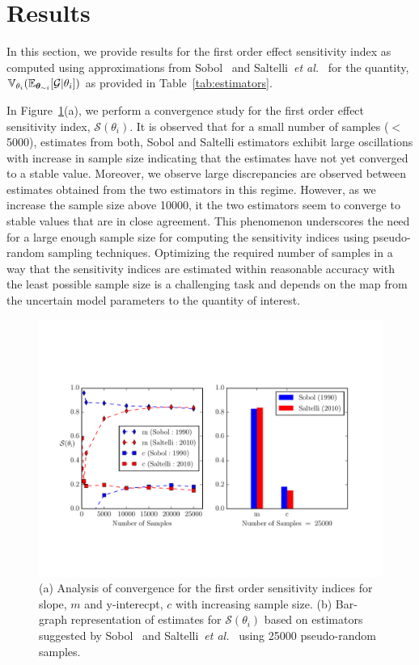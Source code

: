 \section{Results}

In this section, we provide results for the first order effect sensitivity index as computed using approximations
from Sobol~\cite{Sobol:1990} and Saltelli~\emph{et al.}~\cite{Saltelli:2010} for the quantity,
$\operatorname{\mathbb{V}}_{\theta_{i}}(\operatorname{\mathbb{E}}_{\bm \theta_{\sim i}}[\mathcal{G}\vert\theta_{i}])$ as provided in Table~\ref{tab:estimators}.
 
In Figure~\ref{fig:sensitivity}(a), we perform a convergence study for the first order effect sensitivity index,
$\mathcal{S}(\theta_{i})$. It is observed that for a small number of samples ($<$ 5000), estimates from both,
Sobol and Saltelli estimators exhibit large oscillations with increase in sample size indicating that the
estimates have not yet converged to a stable value. Moreover, we observe large discrepancies are observed between
estimates obtained from the two estimators in this regime. However, as we increase the sample size above 10000, it
the two estimators seem to converge to stable values that are in close agreement. This phenomenon underscores the
need for a large enough sample size for computing the sensitivity indices using pseudo-random sampling techniques. 
Optimizing the required number of samples in a way that the sensitivity indices are estimated within  reasonable
accuracy with the least possible sample size is a challenging task and depends on the map from the uncertain
model parameters to the quantity of interest. 

\begin{figure}[htbp]
\begin{center}
\includegraphics[width=1.0\textwidth]{sensitivity_plot.pdf}
\end{center}
\caption{(a) Analysis of convergence for the first order sensitivity indices for slope, $m$ and
y-interecpt, $c$ with increasing sample size. (b) Bar-graph representation of estimates for $\mathcal{S}(\theta_{i})$
based on estimators suggested by Sobol~\cite{Sobol:1990} and Saltelli~\emph{et al.}~\cite{Saltelli:2010} using 25000
pseudo-random samples.}
\label{fig:sensitivity}
\end{figure}

